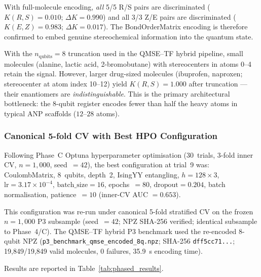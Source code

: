 With full-molecule encoding, \emph{all} 5/5 R/S pairs are discriminated
($K(R,S) = 0.010$; $\Delta K = 0.990$) and all 3/3 Z/E pairs are discriminated
($K(E,Z) = 0.983$; $\Delta K = 0.017$). The BondOrderMatrix encoding is
therefore confirmed to embed genuine stereochemical information into the
quantum state.

With the $n_{\text{qubits}} = 8$ truncation used in the QMSE--TF hybrid pipeline,
small molecules (alanine, lactic acid, 2-bromobutane) with stereocenters
in atoms 0--4 retain the signal. However, larger drug-sized molecules
(ibuprofen, naproxen; stereocenter at atom index 10--12) yield $K(R,S) = 1.000$
after truncation --- their enantiomers are \emph{indistinguishable}. This is
the primary architectural bottleneck: the 8-qubit register encodes fewer
than half the heavy atoms in typical ANP scaffolds ($12$--$28$ atoms).

\subsubsection{Canonical 5-fold CV with Best HPO Configuration}

Following Phase~C Optuna hyperparameter optimisation (30~trials, 3-fold inner CV,
$n = 1{,}000$, seed~$=42$), the best configuration at trial~9 was:
CoulombMatrix, 8~qubits, depth~2, IsingYY entangling, $h = 128 \times 3$,
$\text{lr} = 3.17 \times 10^{-4}$, $\text{batch\_size} = 16$, epochs~$= 80$,
$\text{dropout} = 0.204$, batch normalisation, patience~$= 10$
(inner-CV AUC $= 0.653$).

This configuration was re-run under canonical 5-fold stratified CV on the
frozen $n = 1{,}000$ P3 subsample (seed~$= 42$; NPZ SHA-256 verified;
identical subsample to Phase~4/C). The QMSE--TF hybrid P3 benchmark used the
re-encoded 8-qubit NPZ
(\texttt{p3\_benchmark\_qmse\_encoded\_8q.npz};
SHA-256 \texttt{dff5cc71...}; 19{,}849/19{,}849 valid molecules, 0 failures,
35.9~s encoding time).

Results are reported in Table~\ref{tab:phased_results}.

